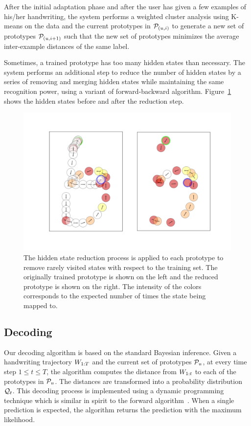 \documentclass{sigchi}
\begin{document}
After the initial adaptation phase and after the user has given a few
examples of his/her handwriting, the system performs a weighted cluster
analysis using K-means on the data and the current prototypes in
$\mathcal{P}_{(u,i)}$ to generate a new set of prototypes
$\mathcal{P}_{(u,i+1)}$ such that the new set of prototypes minimizes the
average inter-example distances of the same label. 

Sometimes, a trained prototype has too many hidden states than
necessary. The system performs an additional step to reduce the number
of hidden states by a series of removing and merging hidden states
while maintaining the same recognition power, using a variant of
forward-backward algorithm. Figure~\ref{fig:state_reduction} shows the
hidden states before and after the reduction step.

\begin{figure}
  \centering
  \includegraphics[width=0.9\columnwidth] {figures/state_reduction.png}
  \caption{The hidden state reduction process is applied to each
    prototype to remove rarely visited states with respect to the
    training set. The originally trained prototype is shown on the
    left and the reduced prototype is shown on the right. The
    intensity of the colors corresponds to the expected number of
    times the state being mapped to. }
  \label{fig:state_reduction}
\end{figure}

\subsection{Decoding}

Our decoding algorithm is based on the standard Bayesian inference.
Given a handwriting trajectory $W_{1:{T}}$ and the current set of
prototypes $\mathcal{P}_u$, at every time step $1 \le t \le T$, the
algorithm computes the distance from $W_{1:{t}}$ to each of the
prototypes in $\mathcal{P}_u$. The distances are transformed into a
probability distribution $\mathcal{Q}_{t}$. This decoding process is
implemented using a dynamic programming technique which is similar in
spirit to the forward algorithm~\cite{Bilmes97}. When a single prediction is expected,
the algorithm returns the prediction with the maximum likelihood.
\end{document}
